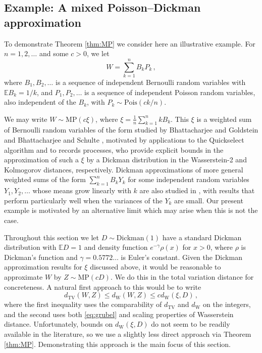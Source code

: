 \documentclass[12pt]{article}
\begin{document}
\subsection{Example: A mixed Poisson--Dickman approximation}\label{subsec:pois_dickman}

To demonstrate Theorem \ref{thm:MP} we consider here an illustrative example. For $n=1,2,\ldots$ and some $c>0$, we let
\begin{equation}\label{eq:MPD_Wdef}
W=\sum_{k=1}^nB_kP_k\,,
\end{equation}
where $B_1,B_2,\ldots$ is a sequence of independent Bernoulli random variables with $\mathbb{E}B_k=1/k$, and $P_1,P_2,\ldots$ is a sequence of independent Poisson random variables, also independent of the $B_k$, with $P_k\sim\text{Pois}(ck/n)$. 

We may write $W\sim\text{MP}(c\xi)$, where $\xi=\frac{1}{n}\sum_{k=1}^nkB_k$. This $\xi$ is a weighted sum of Bernoulli random variables of the form studied by Bhattacharjee and Goldstein \cite{bhattacharjee19} and Bhattacharjee and Schulte \cite{bhattacharjee22}, motivated by applications to the Quickselect algorithm and to records processes, who provide explicit bounds in the approximation of such a $\xi$ by a Dickman distribution in the Wasserstein-2 and Kolmogorov distances, respectively. Dickman approximations of more general weighted sums of the form $\sum_{k=1}^nB_kY_k$ for some independent random variables $Y_1,Y_2,\ldots$ whose means grow linearly with $k$ are also studied in \cite{bhattacharjee19,bhattacharjee22}, with results that perform particularly well when the variances of the $Y_k$ are small. Our present example is motivated by an alternative limit which may arise when this is not the case. 

Throughout this section we let $D\sim\text{Dickman}(1)$ have a standard Dickman distribution with $\mathbb{E}D=1$ and density function $e^{-\gamma}\rho(x)$ for $x>0$, where $\rho$ is Dickman's function and $\gamma=0.5772\ldots$ is Euler's constant. Given the Dickman approximation results for $\xi$ discussed above, it would be reasonable to approximate $W$ by $Z\sim\text{MP}(cD)$. We do this in the total variation distance for concreteness. A natural first approach to this would be to write
\[
d_\text{TV}(W,Z)\leq d_\text{W}(W,Z)\leq cd_\text{W}(\xi,D)\,,
\]
where the first inequality uses the comparability of $d_\text{TV}$ and $d_\text{W}$ on the integers, and the second uses both \eqref{eq:grubel} and scaling properties of Wasserstein distance. Unfortunately, bounds on $d_\text{W}(\xi,D)$ do not seem to be readily available in the literature, so we use a slightly less direct approach via Theorem \ref{thm:MP}. Demonstrating this approach is the main focus of this section.
\end{document}
